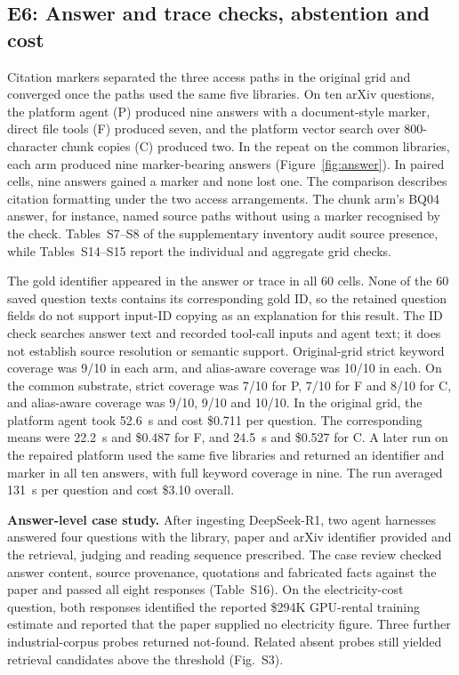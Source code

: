 \subsection{E6: Answer and trace checks, abstention and cost}
\label{sec:e5}
\label{sec:agentic}\label{sec:abstention}\label{sec:composition}\label{sec:eval-agent}
Citation markers separated the three access paths in the original grid
and converged once the paths used the same five libraries. On ten arXiv
questions, the platform agent (P) produced nine answers with a
document-style marker, direct file tools (F) produced seven, and the
platform vector search over 800-character chunk copies (C) produced two.
In the repeat on the common libraries, each arm produced nine marker-bearing
answers (Figure~\ref{fig:answer}). In paired cells, nine answers gained a
marker and none lost one. The comparison describes citation formatting
under the two access arrangements. The chunk arm's BQ04 answer, for
instance, named source paths without using a marker recognised by the
check. Tables~S7--S8 of the supplementary inventory audit source presence,
while Tables~S14--S15 report the individual and aggregate grid checks.

The gold identifier appeared in the answer or trace in all 60 cells.
None of the 60 saved question texts contains its corresponding gold ID, so
the retained question fields do not support input-ID copying as an explanation
for this result. The ID check searches answer text and recorded tool-call
inputs and agent text; it does not establish source resolution or semantic
support. Original-grid strict keyword coverage was 9/10 in each arm, and
alias-aware coverage was 10/10 in each. On the common substrate, strict
coverage was
7/10 for P, 7/10 for F and 8/10 for C, and alias-aware coverage was
9/10, 9/10 and 10/10. In the original grid, the platform agent took
52.6~s and cost \$0.711 per question. The corresponding means were 22.2~s
and \$0.487 for F, and 24.5~s and \$0.527 for C. A later run on the
repaired platform used the same five libraries and returned an identifier
and marker in all ten answers, with full keyword coverage in nine.
The run averaged 131~s per question and cost \$3.10 overall.

\textbf{Answer-level case study.} After ingesting DeepSeek-R1, two agent
harnesses answered four questions with the library, paper and arXiv identifier
provided and the retrieval, judging and reading sequence prescribed.
The case review checked answer content, source provenance, quotations
and fabricated facts against the paper and passed all eight responses
(Table~S16). On the electricity-cost question, both responses identified
the reported \$294K GPU-rental training estimate and reported that the
paper supplied no electricity figure. Three further industrial-corpus
probes returned not-found. Related absent probes still yielded retrieval
candidates above the threshold (Fig.~S3).

